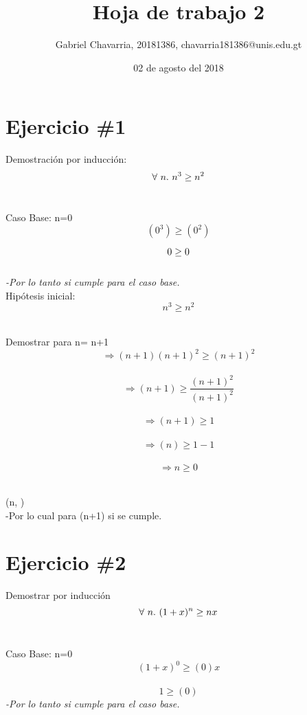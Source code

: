 \documentclass{article}
\begin{document}
\title{Hoja de trabajo 2}
\author{Gabriel Chavarria, 20181386, chavarria181386@unis.edu.gt}
\date{02 de agosto del 2018}

\maketitle

\section{Ejercicio \#1}

\raggedright Demostración por inducción:\\
$$\centering\forall\ n.\ n^3\geq n^2$$\\
\raggedright Caso Base: n=0 \\
$$(0^3) \geq (0^2)$$

$$\centering 0 \geq 0 $$\\ \textit{-Por lo tanto si cumple para el caso base.}\\




 \centering Hipótesis inicial:$$ n^3\geq n^2$$\\
\raggedright Demostrar para  n= n+1 \\ 
$$\Rightarrow (n+1)(n+1)^2 \geq (n+1)^2 $$\\
$$\Rightarrow (n+1) \geq \frac{(n+1)^2}{(n+1)^2} $$\\ 
$$\Rightarrow (n+1) \geq 1 $$\\
$$\Rightarrow (n) \geq 1-1$$ \\
$$\Rightarrow n \geq 0 $$\\


\raggedright (n\in{}, )\\
-Por lo cual para (n+1) si se cumple.\\

\section{Ejercicio \#2}
\raggedright Demostrar por inducción \\

$$\centering\forall\ n.\ (1+x)^n\geq nx$$\\
\raggedright Caso Base: n=0 \\
$$ (1+x)^0\geq (0)x$$\\
$$ 1\geq (0)$$ \textit{-Por lo tanto si cumple para el caso base.}\\
\end{document}

